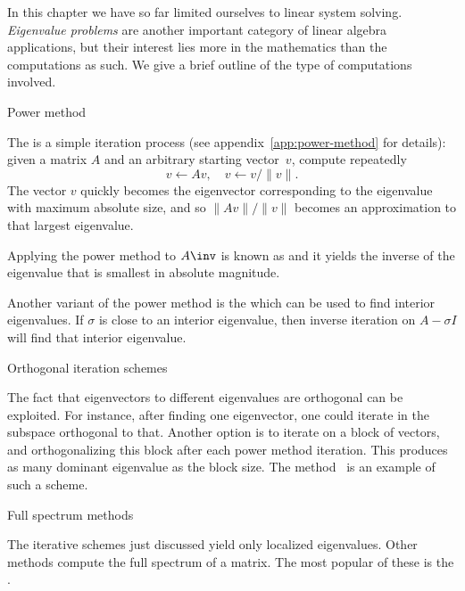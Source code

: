 
In this chapter we have so far limited ourselves to linear system
solving. \emph{Eigenvalue problems} are another important category of
linear algebra applications, but their interest lies more in the
mathematics than the computations as such.
We give a brief outline of the type of computations involved.

 {Power method}

The  is a simple iteration process
(see appendix~\ref{app:power-method} for details):
%
given a matrix $A$ and an arbitrary starting vector~$v$, compute
repeatedly
\[ v\leftarrow Av,\quad v\leftarrow v/\|v\|. \]
The vector $v$ quickly becomes the eigenvector corresponding to the
eigenvalue with maximum absolute size, and so $\|Av\|/\|v\|$ becomes
an approximation to that largest eigenvalue.

Applying the power method to $A\inv$ is known as
%
and it yields the inverse of the eigenvalue that is smallest in
absolute magnitude.

Another variant of the power method is the
%
which can be used to find interior eigenvalues. If $\sigma$ is close
to an interior eigenvalue, then inverse iteration on $A-\sigma I$ will
find that interior eigenvalue.

 {Orthogonal iteration schemes}

The fact that eigenvectors to different eigenvalues are orthogonal can
be exploited. For instance, after finding one eigenvector, one could
iterate in the subspace orthogonal to that. Another option is to
iterate on a block of vectors, and orthogonalizing this block after
each power method iteration. This produces as many dominant eigenvalue
as the block size. The 
method~\cite{leho:95} is an example of such a scheme.

 {Full spectrum methods}

The iterative schemes just discussed yield only localized eigenvalues.
Other methods compute the full spectrum of a matrix. The most popular
of these is the .

